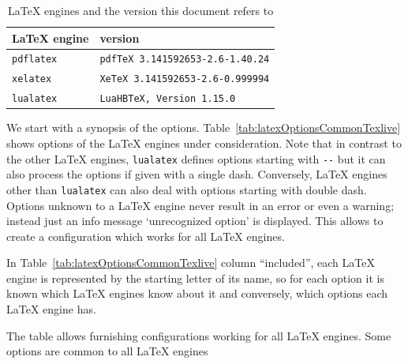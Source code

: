 \documentclass[a4paper]{article}%
\newcommand{\pdflatex}{\texttt{pdflatex}}
\newcommand{\lualatex}{\texttt{lualatex}}
\newcommand{\xelatex}{\texttt{xelatex}}
\begin{document}
\begin{longtable}{ll}
  \toprule
  \LaTeX{} engine & version \\
  \midrule
  \midrule
  \endfirsthead%
  \bottomrule
  \caption{\label{tab:versions} \LaTeX{} engines and the version this document refers to }
  \endlastfoot%
  \pdflatex{}  & \texttt{pdfTeX 3.141592653-2.6-1.40.24} \\%
  \xelatex{}   & \texttt{XeTeX 3.141592653-2.6-0.999994} \\%
  \lualatex{}  & \texttt{LuaHBTeX, Version 1.15.0} \\
\end{longtable}


We start with a synopsis of the options. 
Table~\ref{tab:latexOptionsCommonTexlive} 
shows options of the \LaTeX{} engines under consideration. 
Note that in contrast to the other \LaTeX{} engines, 
\lualatex{} defines options starting with \texttt{-{}-} 
but it can also process the options if given with a single dash. 
Conversely, \LaTeX{} engines other than \lualatex{} 
can also deal with options starting with double dash. 
Options unknown to a \LaTeX{} engine never result in an error or even a warning; 
instead just an info message `unrecognized option' is displayed. 
This allows to create a configuration which works for all \LaTeX{} engines. 

In Table~\ref{tab:latexOptionsCommonTexlive} column ``included'', 
each \LaTeX{} engine is represented by the starting letter of its name, 
so for each option it is known which \LaTeX{} engines know about it 
and conversely, which options each \LaTeX{} engine has. 

The table allows furnishing configurations working for all \LaTeX{} engines. 
Some options are common to all \LaTeX{} engines
\end{document}
